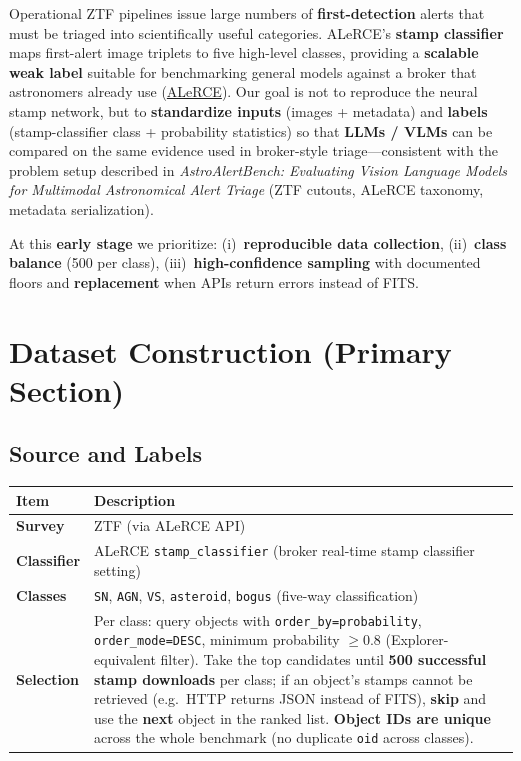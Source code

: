 \documentclass[11pt,a4paper]{article}
\begin{document}
Operational ZTF pipelines issue large numbers of \textbf{first-detection} alerts that must be triaged into scientifically useful categories. ALeRCE's \textbf{stamp classifier} maps first-alert image triplets to five high-level classes, providing a \textbf{scalable weak label} suitable for benchmarking general models against a broker that astronomers already use (\href{https://science.alerce.online/}{ALeRCE}). Our goal is not to reproduce the neural stamp network, but to \textbf{standardize inputs} (images + metadata) and \textbf{labels} (stamp-classifier class + probability statistics) so that \textbf{LLMs / VLMs} can be compared on the same evidence used in broker-style triage---consistent with the problem setup described in \textit{AstroAlertBench: Evaluating Vision Language Models for Multimodal Astronomical Alert Triage} (ZTF cutouts, ALeRCE taxonomy, metadata serialization).

At this \textbf{early stage} we prioritize: (i)~\textbf{reproducible data collection}, (ii)~\textbf{class balance} (500 per class), (iii)~\textbf{high-confidence sampling} with documented floors and \textbf{replacement} when APIs return errors instead of FITS.

\section{Dataset Construction (Primary Section)}

\subsection{Source and Labels}

\begin{tabularx}{\textwidth}{@{}l X@{}}
\toprule
\textbf{Item} & \textbf{Description} \\
\midrule
\textbf{Survey} & ZTF (via ALeRCE API) \\
\textbf{Classifier} & ALeRCE \texttt{stamp\_classifier} (broker real-time stamp classifier setting) \\
\textbf{Classes} & \texttt{SN}, \texttt{AGN}, \texttt{VS}, \texttt{asteroid}, \texttt{bogus} (five-way classification) \\
\textbf{Selection} & Per class: query objects with \texttt{order\_by=probability}, \texttt{order\_mode=DESC}, minimum probability $\geq 0.8$ (Explorer-equivalent filter). Take the top candidates until \textbf{500 successful stamp downloads} per class; if an object's stamps cannot be retrieved (e.g.\ HTTP returns JSON instead of FITS), \textbf{skip} and use the \textbf{next} object in the ranked list. \textbf{Object IDs are unique} across the whole benchmark (no duplicate \texttt{oid} across classes). \\
\bottomrule
\end{tabularx}
\end{document}

